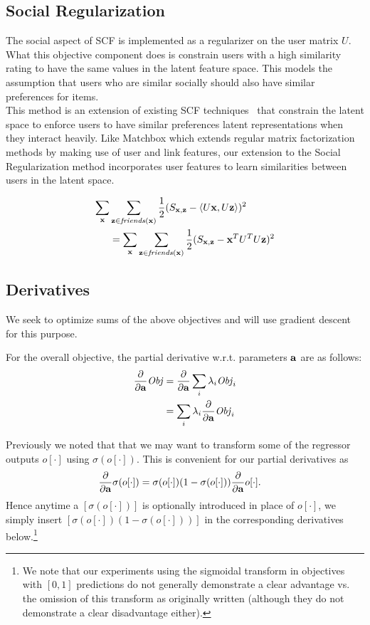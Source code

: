 \subsection{Social Regularization}
\label{sec:SocRec}
The social aspect of SCF is implemented as a regularizer on the user matrix $U$. What this objective component does is constrain users with a high similarity rating to have the same values in the latent feature space. This models the assumption that users who are similar socially should also have similar preferences for items.
\\

This method is an extension of existing SCF techniques~\cite{lla,socinf} that constrain the latent space to enforce users  to have similar preferences latent representations when they interact heavily. Like Matchbox which extends regular matrix factorization methods by making use of user and link features, our extension to the Social Regularization method incorporates user features to learn similarities between users in the latent space.

\begin{align}
\sum_{\mathbf{x}} & \sum_{\mathbf{z} \in \mathit{friends}(\mathbf{x})} \frac{1}{2} (S_{\mathbf{x},\mathbf{z}} - \langle U\mathbf{x}, U\mathbf{z} \rangle)^2 \nonumber \\
& = \sum_{\mathbf{x}} \sum_{\mathbf{z} \in \mathit{friends}(\mathbf{x})} \frac{1}{2} (S_{\mathbf{x},\mathbf{z}} - \mathbf{x}^T U^T U \mathbf{z})^2
\end{align}

\subsection{Derivatives}

We seek to optimize sums of the above objectives and will use
gradient descent for this purpose.  

For the overall objective, the partial derivative 
w.r.t. parameters $\mathbf{a}$ are as follows:
\begin{align*}
\frac{\partial}{\partial \mathbf{a}} \mathit{Obj} & = \frac{\partial}{\partial \mathbf{a}} \sum_i \lambda_i \mathit{Obj}_i\\
& = \sum_i \lambda_i \frac{\partial}{\partial \mathbf{a}} \mathit{Obj}_i \label{eq:sum_der}
\end{align*}

Previously we noted that that we may want to transform
some of the regressor outputs $o[\cdot]$ using $\sigma(o[\cdot])$.  
This is convenient for our partial derivatives as
\begin{align}
 \frac{\partial}{\partial \mathbf{a}}\sigma(o[\cdot]) & = \sigma(o[\cdot]) (1 - \sigma(o[\cdot])) \frac{\partial}{\partial \mathbf{a}} o[\cdot] .
\end{align}
Hence anytime a $[\sigma(o[\cdot])]$ is optionally 
introduced in place of $o[\cdot]$, we simply
insert $[\sigma(o[\cdot]) (1 - \sigma(o[\cdot]))]$ in the corresponding derivatives 
below.\footnote{We note that our experiments using the sigmoidal transform in
objectives with $[0,1]$ predictions do not generally demonstrate a
clear advantage vs. the omission of this transform as originally
written (although they do not demonstrate a clear disadvantage
either).}

